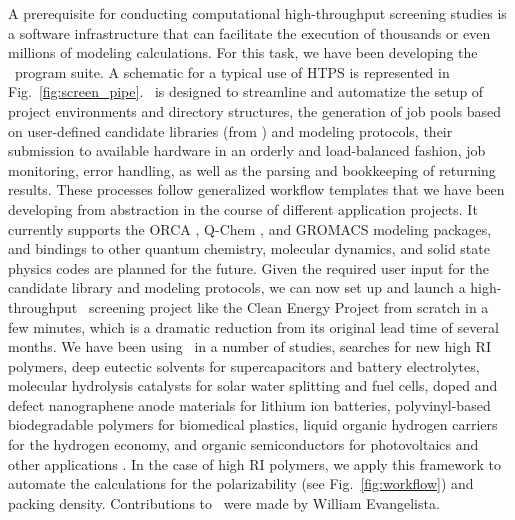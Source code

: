 A prerequisite for conducting computational high-throughput screening studies is a software infrastructure that can facilitate the execution of thousands or even millions of modeling calculations. For this task, we have been developing the \chemhtps\ program suite. A schematic for a typical use of HTPS is represented in Fig.\ \ref{fig:screen_pipe}. \chemhtps\ is designed to streamline and automatize the setup of project environments and directory structures, the generation of job pools based on user-defined candidate libraries (\eg  from \chemlg ) and modeling protocols, their submission to available hardware in an orderly and load-balanced fashion, job monitoring, error handling, as well as the parsing and bookkeeping of returning results. These processes follow generalized workflow templates that we have been developing from abstraction in the course of different application projects. It currently supports the ORCA \cite{Neese2012}, Q-Chem \cite{Shao2014}, and GROMACS \cite{ABRAHAM201519} modeling packages, and bindings to other quantum chemistry, molecular dynamics, and solid state physics codes are planned for the future. Given the required user input for the candidate library and modeling protocols, we can now set up and launch a high-throughput \insilico\ screening project like the Clean Energy Project \cite{Hachmann2011,Olivares-Amaya2011,Amador-Bedolla2013,Hachmann2014,Pyzer-Knapp2015,Lopez2016} from scratch in a few minutes, which is a dramatic reduction from its original lead time of several months. We have been using \chemhtps\ in a number of studies, searches for new high RI polymers, deep eutectic solvents for supercapacitors and battery electrolytes, molecular hydrolysis catalysts for solar water splitting and fuel cells, doped and defect nanographene anode materials for lithium ion batteries, polyvinyl-based biodegradable polymers for biomedical plastics, liquid organic hydrogen carriers for the hydrogen economy, and organic semiconductors for photovoltaics and other applications \cite{Hachmann2011,Olivares-Amaya2011,Amador-Bedolla2013,Hachmann2014,Lopez2016,Afzal2018a,yujie_msthesis,chingyen_msthesis,manprep}. In the case of high RI polymers, we apply this framework to automate the calculations for the polarizability (see Fig.\ \ref{fig:workflow}) and packing density. Contributions to \chemhtps\ were made by William Evangelista. 

